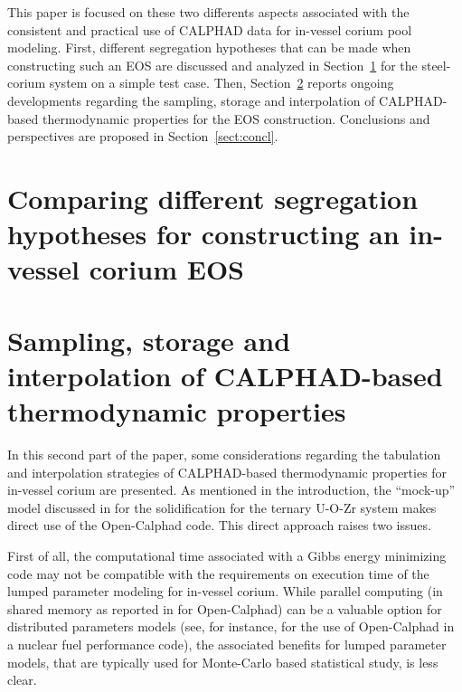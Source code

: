 \documentclass[11pt]{article}\usepackage{geometry} \geometry{letterpaper, margin=25.4mm}
\newcommand{\Sect}[1]{Section~\ref{sect:#1}}
\begin{document}
This paper is focused on these two differents aspects associated with the consistent and practical use of CALPHAD data for in-vessel corium pool modeling.
First, different segregation hypotheses that can be made when constructing such an EOS are discussed and analyzed in \Sect{analytical} for the steel-corium system on a simple test case. Then, \Sect{practical} reports ongoing developments regarding the sampling, storage and interpolation of CALPHAD-based thermodynamic properties for the EOS construction. Conclusions and perspectives are proposed in \Sect{concl}.

\section{Comparing different segregation hypotheses for constructing an in-vessel corium EOS} \label{sect:analytical}



\section{Sampling, storage and interpolation of CALPHAD-based thermodynamic properties} \label{sect:practical}

In this second part of the paper, some considerations regarding the tabulation and interpolation strategies of CALPHAD-based thermodynamic properties for in-vessel corium are presented. As mentioned in the introduction, the ``mock-up'' model discussed in \cite{Tiwari2018} for the solidification for the ternary U-O-Zr system makes direct use of the Open-Calphad code. This direct approach raises two issues. 

First of all, the computational time associated with a Gibbs energy minimizing code may not be compatible with the requirements on execution time of the lumped parameter modeling for in-vessel corium. While parallel computing (in shared memory as reported in \cite{Sundman2016} for Open-Calphad) can be a valuable option for distributed parameters models (see, for instance, \cite{Introini2018} for the use of Open-Calphad in a nuclear fuel performance code), the associated benefits for lumped parameter models, that are typically used for Monte-Carlo based statistical study, is less clear. 
\end{document}
